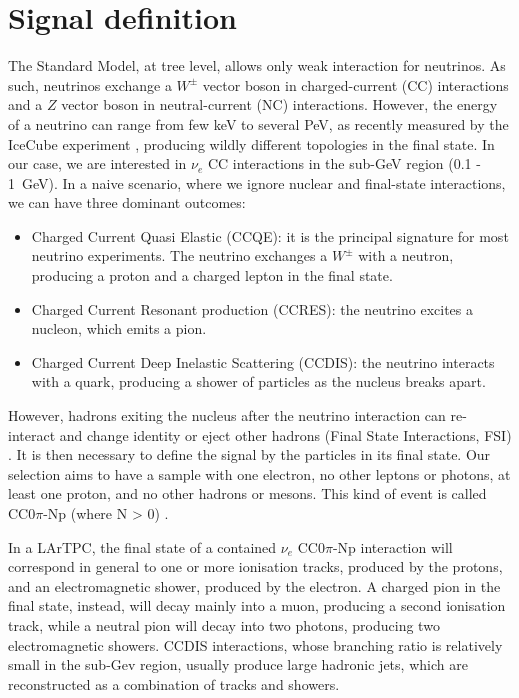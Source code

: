 
\section{Signal definition}
The Standard Model, at tree level, allows only weak interaction for neutrinos. As such, neutrinos exchange a $W^{\pm}$ vector boson in charged-current (CC) interactions and a $Z$ vector boson in neutral-current (NC) interactions. 
However, the energy of a neutrino can range from few keV to several PeV, as recently measured by the IceCube experiment \cite{icecube}, producing wildly different topologies in the final state. 
In our case, we are interested in $\nu_{e}$ CC interactions in the sub-GeV region (0.1 - 1~GeV). In a naive scenario, where we ignore nuclear and final-state interactions, we can have three dominant outcomes:
\begin{itemize}
\item Charged Current Quasi Elastic (CCQE): it is the principal signature for most neutrino experiments. The neutrino exchanges a $W^{\pm}$ with a neutron, producing a proton and a charged lepton in the final state.
\item Charged Current Resonant production (CCRES): the neutrino excites a nucleon, which emits a pion.
\item Charged Current Deep Inelastic Scattering (CCDIS): the neutrino interacts with a quark, producing a shower of particles as the nucleus breaks apart.
\end{itemize}

However, hadrons exiting the nucleus after the neutrino interaction can re-interact and change identity or eject other hadrons (Final State Interactions, FSI) \cite{ccqe2}. It is then necessary to define the signal by the particles in its final state. Our selection aims to have a sample with one electron, no other leptons or photons, at least one proton, and no other hadrons or mesons. This kind of event is called CC0$\pi$-Np (where N > 0) \cite{teppei}.

In a LArTPC, the final state of a contained $\nu_{e}$ CC0$\pi$-Np interaction will correspond in general to one or more ionisation tracks, produced by the protons, and an electromagnetic shower, produced by the electron. A charged pion in the final state, instead, will decay mainly into a muon, producing a second ionisation track, while a neutral pion will decay into two photons, producing two electromagnetic showers. 
CCDIS interactions, whose branching ratio is relatively small in the sub-Gev region, usually produce large hadronic jets, which are reconstructed as a combination of tracks and showers. 


